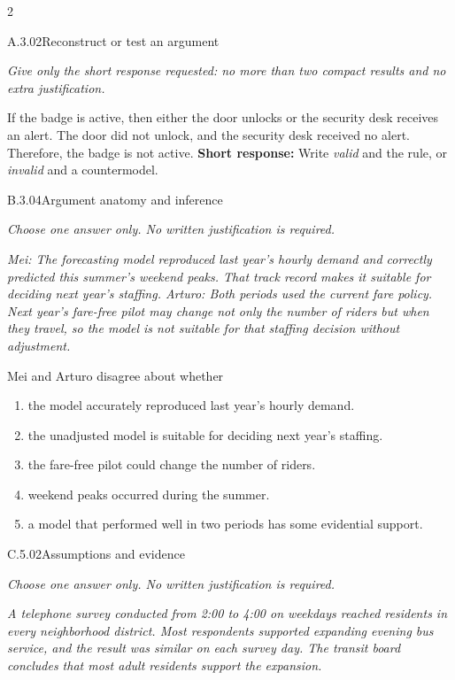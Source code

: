 \documentclass[9pt]{extarticle}
\newcommand{\choice}[1]{\item #1}
\begin{document}
\begin{multicols}{2}
\begin{DenseCoreProblem}{A.3.02}{Reconstruct or test an argument}
{\scriptsize\textit{Give only the short response requested: no more than two compact results and no extra justification.}\par}
If the badge is active, then either the door unlocks or the security desk receives an alert. The door did not unlock, and the security desk received no alert. Therefore, the badge is not active.
\textbf{Short response:} Write \emph{valid} and the rule, or \emph{invalid} and a countermodel.
\end{DenseCoreProblem}
\begin{DenseCoreProblem}{B.3.04}{Argument anatomy and inference}
{\scriptsize\textit{Choose one answer only. No written justification is required.}\par}
\emph{Mei: The forecasting model reproduced last year's hourly demand and correctly predicted this summer's weekend peaks. That track record makes it suitable for deciding next year's staffing. Arturo: Both periods used the current fare policy. Next year's fare-free pilot may change not only the number of riders but when they travel, so the model is not suitable for that staffing decision without adjustment.}

Mei and Arturo disagree about whether
\begin{enumerate}[label=(\alph*)]
  \choice{the model accurately reproduced last year's hourly demand.}
  \choice{the unadjusted model is suitable for deciding next year's staffing.}
  \choice{the fare-free pilot could change the number of riders.}
  \choice{weekend peaks occurred during the summer.}
  \choice{a model that performed well in two periods has some evidential support.}
\end{enumerate}
\end{DenseCoreProblem}
\columnbreak
\begin{DenseCoreProblem}{C.5.02}{Assumptions and evidence}
{\scriptsize\textit{Choose one answer only. No written justification is required.}\par}
\emph{A telephone survey conducted from 2:00 to 4:00 on weekdays reached residents in every neighborhood district. Most respondents supported expanding evening bus service, and the result was similar on each survey day. The transit board concludes that most adult residents support the expansion.}


\end{DenseCoreProblem}
\end{multicols}
\end{document}
